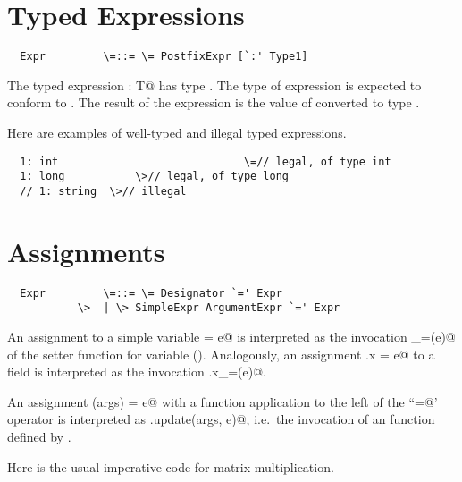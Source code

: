 \documentclass[11pt]{report}
\begin{document}
\section{Typed Expressions}

\syntax\begin{verbatim}
  Expr	       \=::= \= PostfixExpr [`:' Type1]
\end{verbatim}

The typed expression \verb@e: T@ has type \verb@T@. The type of
expression \verb@e@ is expected to conform to \verb@T@. The result of
the expression is the value of \verb@e@ converted to type \verb@T@.

\example Here are examples of well-typed and illegal typed expressions.

\begin{verbatim}
  1: int                             \=// legal, of type int
  1: long	    	\>// legal, of type long
  // 1: string 	\>// illegal
\end{verbatim}

\section{Assignments}

\syntax\begin{verbatim}
  Expr	       \=::= \= Designator `=' Expr
	       \>  | \> SimpleExpr ArgumentExpr `=' Expr
\end{verbatim}

An assignment to a simple variable \verb@x = e@ is interpreted as the invocation
\verb@x_=(e)@ of the setter function for variable
\verb@x@ ().
Analogously, an assignment \verb@f.x = e@ to a field \verb@x@ is interpreted
as the invocation \verb@f.x_=(e)@.

An assignment \verb@f(args) = e@ with a function application to the
left of the ``\verb@=@' operator is interpreted as 
\verb@f.update(args, e)@, i.e.\
the invocation of an \verb@update@ function defined by \verb@f@.

\example Here is the usual imperative code for matrix multiplication.
\end{document}
